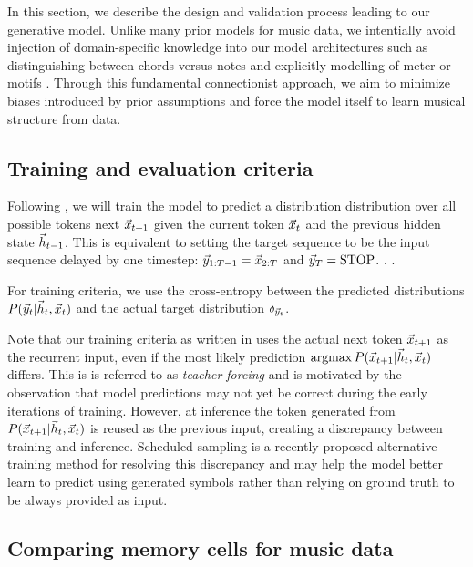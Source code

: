 \documentclass[dissertation.tex]{subfiles}
\begin{document}
In this section, we describe the design and validation process leading to our
generative model. Unlike many prior models for music data, we intentially avoid
injection of domain-specific knowledge into our model architectures such as
distinguishing between chords versus notes
\cite{hild1991harmonet}\cite{mozer1994neural} \cite{Eck2002} and explicitly
modelling of meter \cite{eck2008learning} or motifs \cite{feulner1994melot}.
Through this fundamental connectionist approach, we aim to minimize biases
introduced by prior assumptions and force the model itself to learn musical
structure from data.

\subsection{Training and evaluation criteria}

Following \cite{1994neural}, we will train the model to predict a distribution
distribution over all possible tokens next $\vec{x}_{t+1}$ given the current token
$\vec{x}_{t}$ and the previous hidden state $\vec{h}_{t-1}$. This is equivalent to
setting the target sequence to be the input sequence delayed by one timestep:
$\vec{y}_{1:T-1} = \vec{x}_{2:T}$ and $\vec{y}_T = \text{STOP}$. .
.

For training criteria, we use the cross-entropy between the predicted
distributions $P(\vec{y}_t | \vec{h}_t, \vec{x}_t)$ and the actual target distribution
$\delta_{\vec{y}_t}$.

Note that our training criteria as written in  uses the actual
next token $\vec{x}_{t+1}$ as the recurrent input, even if the most likely
prediction $\operatorname*{argmax} P(\vec{x}_{t+1} | \vec{h}_t, \vec{x}_t)$ differs. This is is referred to
as \emph{teacher forcing}\cite{williams1989learning} and is motivated by the
observation that model predictions may not yet be correct during the early
iterations of training. However, at inference the token generated from
$P(\vec{x}_{t+1} | \vec{h}_t, \vec{x}_t)$ is reused as the previous input, creating a
discrepancy between training and inference. Scheduled sampling
\cite{bengio2015scheduled} is a recently proposed alternative training method
for resolving this discrepancy and may help the model better learn to predict
using generated symbols rather than relying on ground truth to be always
provided as input.

\subsection{Comparing memory cells for music data}
\end{document}
